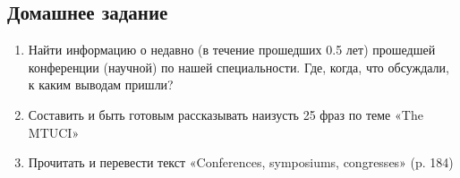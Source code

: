 \documentclass{article}
\begin{document}
\subsection{Домашнее задание}

\begin{enumerate}
    \item Найти информацию о недавно (в течение прошедших 0.5 лет) прошедшей конференции (научной) по нашей специальности. Где, когда, что обсуждали, к каким выводам пришли?
    \item Составить и быть готовым рассказывать наизусть 25 фраз по теме «The MTUCI»
    \item Прочитать и перевести текст «Conferences, symposiums, congresses» (p. 184)
\end{enumerate}
\end{document}
